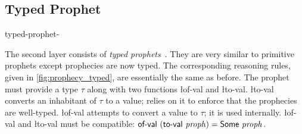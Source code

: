 \subsection{Typed Prophet}
\label{sec:prophecy_typed}

\begin{tirPrefix}{typed-prophet-}



The second layer consists of \emph{typed prophets}~.
They are very similar to primitive prophets except prophecies are now typed.
The corresponding reasoning rules, given in \cref{fig:prophecy_typed}, are essentially the same as before.
The prophet must provide a type $\tau$ along with two functions \l{of-val} and \l{to-val}.
\l{to-val} converts an inhabitant of $\tau$ to a value;  relies on it to enforce that the prophecies are well-typed.
\l{of-val} attempts to convert a value to $\tau$; it is used internally.
\l{of-val} and \l{to-val} must be compatible: $\l{of-val}\ (\l{to-val}\ \v{proph}) = \Some{\v{proph}}$.

\end{tirPrefix}
